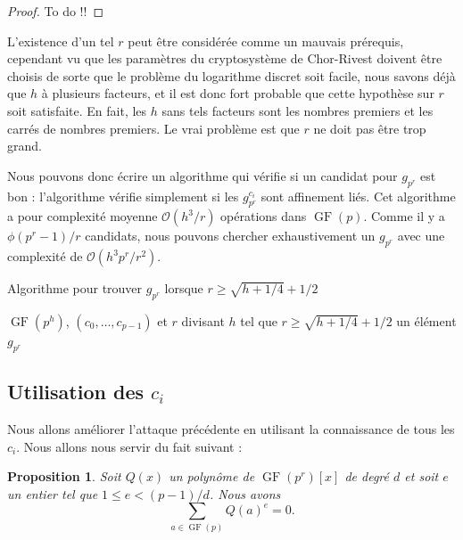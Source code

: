 \documentclass[a4paper, titlepage, 11pt]{article}
\newtheorem{prop}[theo]{Proposition}
\theoremstyle{definition}
\theoremstyle{remark}
\def\O{\mathcal O}
\def\gf{\operatorname{GF}}
\begin{document}
\begin{proof}
To do !!
\end{proof}

L'existence d'un tel $r$ peut être considérée comme un mauvais prérequis, cependant vu que les paramètres du cryptosystème de Chor-Rivest doivent être choisis de sorte que le problème du logarithme discret soit facile, nous savons déjà que $h$ à plusieurs facteurs, et il est donc fort probable que cette hypothèse sur $r$ soit satisfaite. En fait, les $h$ sans tels facteurs sont les nombres premiers et les carrés de nombres premiers. Le vrai problème est que $r$ ne doit pas être trop grand.

Nous pouvons donc écrire un algorithme qui vérifie si un candidat pour $g_{p^r}$ est bon : l'algorithme vérifie simplement si les $g_{p^r}^{c_i}$ sont affinement liés. Cet algorithme a pour complexité moyenne $\O(h^3/r)$ opérations dans $\gf(p)$. Comme il y a $\phi(p^r-1)/r$ candidats, nous pouvons chercher exhaustivement un $g_{p^r}$ avec une complexité de $\O(h^3p^r/r^2)$.

\begin{algorithm}[h]
\caption{Algorithme pour trouver $g_{p^r}$ lorsque $r\geqslant \sqrt{h + 1/4} + 1/2$}
\label{algoTestgpr}
\begin{algorithmic}[1]
\REQUIRE $\gf(p^h)$, $(c_0,\dots, c_{p-1})$ et $r$ divisant $h$ tel que $r\geqslant \sqrt{h + 1/4} + 1/2$
\ENSURE un élément $g_{p^r}$
\FORALL{$\zeta \in \gf(p^h)$ générateur de $\gf(p^r)^\times$} \label{algoTestgprboucle}
		\ENDIF
	\ENDFOR
	\RETURN{$\zeta$}
\ENDFOR
\end{algorithmic}
\end{algorithm}

\subsection{Utilisation des $c_i$}

Nous allons améliorer l'attaque précédente en utilisant la connaissance de tous les $c_i$. Nous allons nous servir du fait suivant :

\begin{prop}
Soit $Q(x)$ un polynôme de $\gf(p^r)[x]$ de degré $d$ et soit $e$ un entier tel que $1 \leqslant e < (p-1)/d$. Nous avons $$\sum_{a \in \gf(p)} Q(a)^e = 0.$$
\end{prop}
\end{document}
